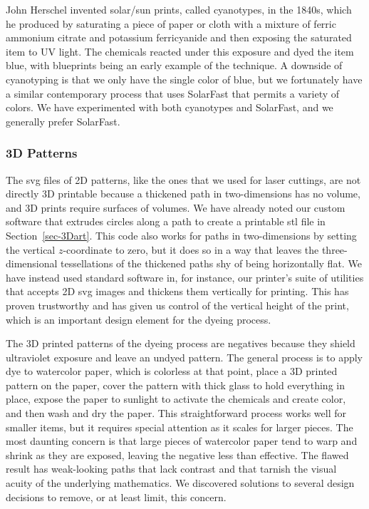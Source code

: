 \documentclass{article}
\begin{document}
John Herschel invented solar/sun prints, called cyanotypes, in the 1840s,
which he produced by saturating a piece of paper or cloth with a mixture of 
ferric ammonium citrate and potassium ferricyanide and then exposing the saturated
item to UV light. The chemicals reacted under this exposure and dyed the item blue, 
with blueprints being an early example of the technique. A downside of 
cyanotyping is that we only have the single color of blue, but we fortunately
have a similar contemporary process that uses SolarFast that permits a variety 
of colors. We have experimented with both cyanotypes and SolarFast, and we 
generally prefer SolarFast.

\subsubsection*{3D Patterns}

The svg files of 2D patterns, like the ones that we used for laser cuttings, are 
not directly 3D printable because a thickened path in two-dimensions has no volume,
and 3D prints require surfaces of volumes. We have already noted our custom software
that extrudes circles along a path to create a printable stl file in Section~\ref{sec-3Dart}.
This code also works for paths in two-dimensions by setting the vertical $z$-coordinate
to zero, but it does so in a way that leaves the three-dimensional tessellations of the
thickened paths shy of being horizontally flat. We have instead used standard software in,
for instance, our printer's suite of utilities that accepts 2D svg images and thickens
them vertically for printing. This has proven trustworthy and has given us control of the
vertical height of the print, which is an important design element for the dyeing process.

The 3D printed patterns of the dyeing process are negatives because they shield
ultraviolet exposure and leave an undyed pattern. The general process is to
apply dye to watercolor paper, which is colorless at that point, place a 3D
printed pattern on the paper, cover the pattern with thick glass to hold everything
in place, expose the paper to sunlight to activate the chemicals and create
color, and then wash and dry the paper. This straightforward process works well
for smaller items, but it requires special attention as it scales for larger pieces.
The most daunting concern is that large pieces of watercolor paper tend to
warp and shrink as they are exposed, leaving the negative less than effective. The
flawed result has weak-looking paths that lack contrast and that tarnish the visual 
acuity of the underlying mathematics. We discovered solutions to several design 
decisions to remove, or at least limit, this concern.
\end{document}
